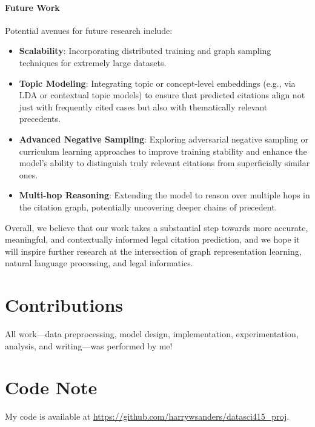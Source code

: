 \documentclass{article}
\begin{document}
\paragraph{Future Work}
Potential avenues for future research include:
\begin{itemize}[leftmargin=*]
    \item \textbf{Scalability}: Incorporating distributed training and graph sampling techniques for extremely large datasets.
    \item \textbf{Topic Modeling}: Integrating topic or concept-level embeddings (e.g., via LDA or contextual topic models) to ensure that predicted citations align not just with frequently cited cases but also with thematically relevant precedents.
    \item \textbf{Advanced Negative Sampling}: Exploring adversarial negative sampling or curriculum learning approaches to improve training stability and enhance the model’s ability to distinguish truly relevant citations from superficially similar ones.
    \item \textbf{Multi-hop Reasoning}: Extending the model to reason over multiple hops in the citation graph, potentially uncovering deeper chains of precedent.
\end{itemize}
    
Overall, we believe that our work takes a substantial step towards more accurate, meaningful, and contextually informed legal citation prediction, and we hope it will inspire further research at the intersection of graph representation learning, natural language processing, and legal informatics.

\section*{Contributions}
All work—data preprocessing, model design, implementation, experimentation, analysis, and writing—was performed by me!

\section*{Code Note}
My code is available at \url{https://github.com/harrywsanders/datasci415_proj}. 

\medskip

\small



\end{document}
